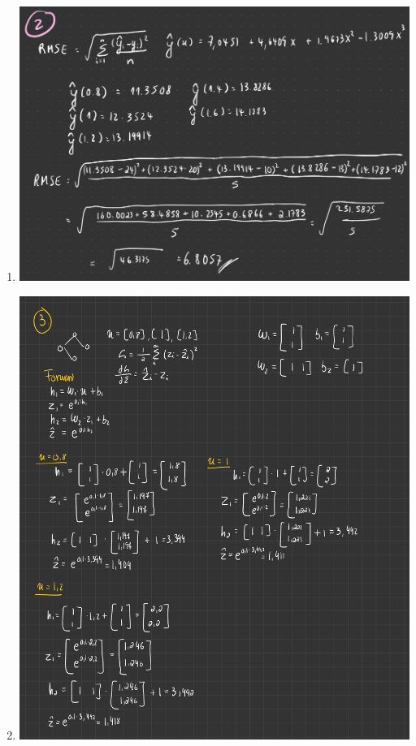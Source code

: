 \documentclass[12pt]{article}
\begin{document}
\begin{enumerate}[leftmargin=\labelsep]
\item \leavevmode\vadjust{\vspace{-\baselineskip}}
\begin{center}
\includegraphics[scale=0.2]{images/Project-35.jpg}
\newline
\end{center}
\newpage
\item \leavevmode\vadjust{\vspace{-\baselineskip}}
\begin{center}
\includegraphics[scale=0.3]{images/hw3-1.jpg}

\end{center}
\end{enumerate}
\end{document}
